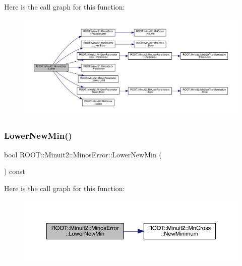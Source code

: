 Here is the call graph for this function\+:
\nopagebreak
\begin{figure}[H]
\begin{center}
\leavevmode
\includegraphics[width=350pt]{d2/dd1/classROOT_1_1Minuit2_1_1MinosError_ac412aab9b0a59a427fbe7e3cfad47f0c_cgraph}
\end{center}
\end{figure}
\mbox{\label{classROOT_1_1Minuit2_1_1MinosError_a9a806056992d1acb26420bf4895b46e9}} 
\subsubsection{\texorpdfstring{LowerNewMin()}{LowerNewMin()}\hspace{0.1cm}{\footnotesize\ttfamily [1/2]}}
{\footnotesize\ttfamily bool R\+O\+O\+T\+::\+Minuit2\+::\+Minos\+Error\+::\+Lower\+New\+Min (\begin{DoxyParamCaption}{ }\end{DoxyParamCaption}) const\hspace{0.3cm}{\ttfamily [inline]}}

Here is the call graph for this function\+:
\nopagebreak
\begin{figure}[H]
\begin{center}
\leavevmode
\includegraphics[width=350pt]{d2/dd1/classROOT_1_1Minuit2_1_1MinosError_a9a806056992d1acb26420bf4895b46e9_cgraph}
\end{center}
\end{figure}
\mbox{\label{classROOT_1_1Minuit2_1_1MinosError_a9a806056992d1acb26420bf4895b46e9}} 
